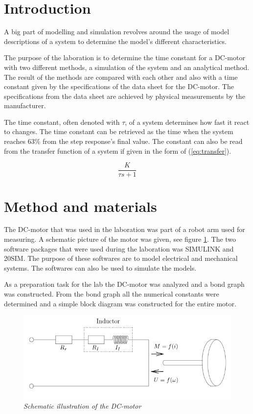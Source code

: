 \documentclass[12pt,a4paper]{article}
\begin{document}
\newpage

\tableofcontents

\newpage

\section{Introduction}
A big part of modelling and simulation revolves around the usage of model descriptions of a system to determine the model's different characteristics.

The purpose of the laboration is to determine the time constant for a DC-motor with two different methods, a simulation of the system and an analytical method. The result of the methods are compared with each other and also with a time constant given by the specifications of the data sheet for the DC-motor. The specifications from the data sheet are achieved by physical measurements by the manufacturer.

The time constant, often denoted with $\tau$, of a system determines how fast it react to changes. The time constant can be retrieved as the time when the system reaches 63\% from the step response's final value. The constant can also be read from the transfer function of a system if given in the form of (\ref{eq:transfer}).

\begin{equation}
\label{eq:transfer}
\frac{K}{\tau s+1}
\end{equation}

\section{Method and materials}
The DC-motor that was used in the laboration was part of a robot arm used for measuring. A schematic picture of the motor was given, see figure \ref{fig:dcmoto}.
The two software packages that were used during the laboration was SIMULINK and 20SIM. The purpose of these softwares are to model electrical and mechanical systems. The softwares can also be used to simulate the models.

As a preparation task for the lab the DC-motor was analyzed and a bond graph was constructed. From the bond graph all the numerical constants were determined and a simple block diagram was constructed for the entire motor. 
\begin{figure}
  \centering
  \includegraphics[width=1\linewidth]{schematicdcmotor.png}
  \caption{\emph{Schematic illustration of the DC-motor}}
  \label{fig:dcmoto}
\end{figure}
\end{document}
